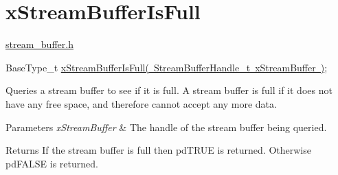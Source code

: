\hypertarget{group__x_stream_buffer_is_full}{}\section{x\+Stream\+Buffer\+Is\+Full}
\label{group__x_stream_buffer_is_full}
\mbox{\hyperlink{stream__buffer_8h}{stream\+\_\+buffer.\+h}}


\begin{DoxyPre}
BaseType\_t \mbox{\hyperlink{stream__buffer_8h_ae393d82ee06e89692248a4381f85dc86}{xStreamBufferIsFull( StreamBufferHandle\_t xStreamBuffer )}};
\end{DoxyPre}


Queries a stream buffer to see if it is full. A stream buffer is full if it does not have any free space, and therefore cannot accept any more data.


\begin{DoxyParams}{Parameters}
{\em x\+Stream\+Buffer} & The handle of the stream buffer being queried.\\
\hline
\end{DoxyParams}
\begin{DoxyReturn}{Returns}
If the stream buffer is full then pd\+T\+R\+UE is returned. Otherwise pd\+F\+A\+L\+SE is returned. 
\end{DoxyReturn}
